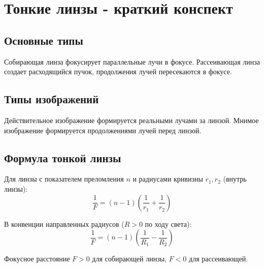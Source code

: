\documentclass{article}
\begin{document}
\section*{Тонкие линзы - краткий конспект}

\subsection*{Основные типы}
Собирающая линза фокусирует параллельные лучи в фокусе. Рассеивающая линза создает расходящийся пучок, продолжения лучей пересекаются в фокусе.

\subsection*{Типы изображений}
Действительное изображение формируется реальными лучами за линзой. Мнимое изображение формируется продолжениями лучей перед линзой.

\subsection*{Формула тонкой линзы}
Для линзы с показателем преломления $n$ и радиусами кривизны $r_1, r_2$ (внутрь линзы):
\[
\frac{1}{F}=(n-1)\left(\frac{1}{r_1}+\frac{1}{r_2}\right)
\]

В конвенции направленных радиусов ($R>0$ по ходу света):
\[
\frac{1}{F}=(n-1)\left(\frac{1}{R_1}-\frac{1}{R_2}\right)
\]

Фокусное расстояние $F>0$ для собирающей линзы, $F<0$ для рассеивающей.
\end{document}
